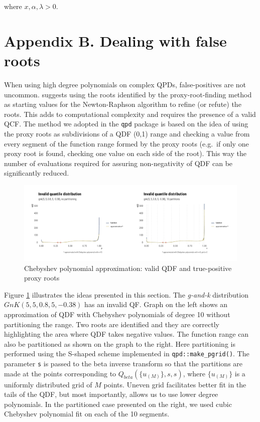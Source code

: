 \documentclass[
  12pt,
]{article}
\begin{document}
where \(x, \alpha, \lambda>0\).

\hypertarget{appendix-b.-dealing-with-false-roots}{%
\section{Appendix B. Dealing with false roots}\label{appendix-b.-dealing-with-false-roots}}

When using high degree polynomials on complex QPDs, false-positives are not uncommon. \citet{boyd2006ComputingRealRoots} suggests using the roots identified by the proxy-root-finding method as starting values for the Newton-Raphson algorithm to refine (or refute) the roots. This adds to computational complexity and requires the presence of a valid QCF. The method we adopted in the \texttt{qpd} package is based on the idea of using the proxy roots as subdivisions of a QDF (0,1) range and checking a value from every segment of the function range formed by the proxy roots (e.g.~if only one proxy root is found, checking one value on each side of the root). This way the number of evaluations required for assuring non-negativity of QDF can be significantly reduced.

\begin{figure}

{\centering \includegraphics{ilbm_article_files/figure-latex/chebyshev-roots-gnk-graph-1} 

}

\caption{Chebyshev polynomial approximation: valid QDF and true-positive proxy roots}\label{fig:chebyshev-roots-gnk-graph}
\end{figure}

Figure \ref{fig:chebyshev-roots-gnk-graph} illustrates the ideas presented in this section. The \emph{g-and-k} distribution \(GnK(5,5,0.8,5,-0.38)\) has an invalid QF. Graph on the left shows an approximation of QDF with Chebyshev polynomials of degree 10 without partitioning the range. Two roots are identified and they are correctly highlighting the area where QDF takes negative values. The function range can also be partitioned as shown on the graph to the right. Here partitioning is performed using the S-shaped scheme implemented in \texttt{qpd::make\_pgrid()}. The parameter \texttt{s} is passed to the beta inverse transform so that the partitions are made at the points corresponding to \(Q_{beta}(\{u_{(M)} \}, s,s)\), where \(\{u_{(M)} \}\) is a uniformly distributed grid of \(M\) points. Uneven grid facilitates better fit in the tails of the QDF, but most importantly, allows us to use lower degree polynomials. In the partitioned case presented on the right, we used cubic Chebyshev polynomial fit on each of the 10 segments.
\end{document}
